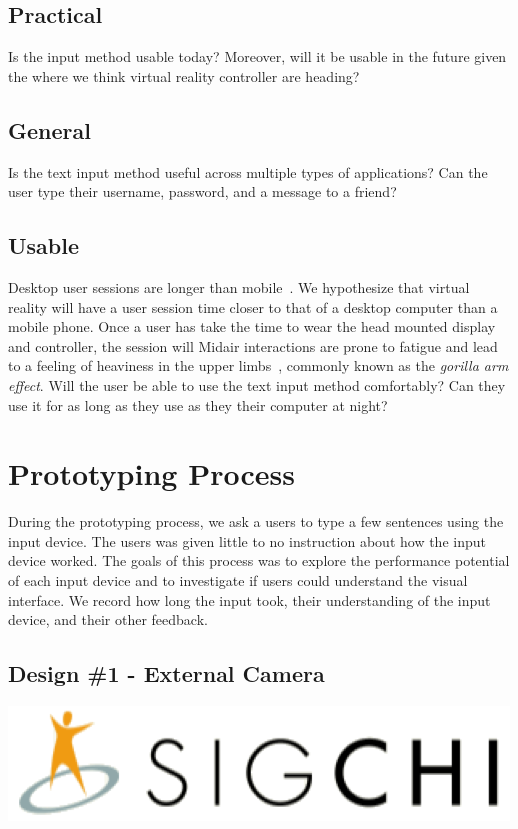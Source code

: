 \documentclass{sigchi}
\begin{document}
\subsection{Practical}
Is the input method usable today?
Moreover, will it be usable in the future given the where we think virtual reality controller are heading?

\subsection{General}
Is the text input method useful across multiple types of applications?
Can the user type their username, password, and a message to a friend?

\subsection{Usable}
Desktop user sessions are longer than mobile~\cite{Kamvar:2009:CIM:1526709.1526817}.
We hypothesize that virtual reality will have a user session time closer to that of a desktop computer than a mobile phone.
Once a user has take the time to wear the head mounted display and controller, the session will
Midair interactions are prone to fatigue and lead to a feeling
of heaviness in the upper limbs~\cite{Hincapie-Ramos:2014:CEM:2556288.2557130}, commonly known as the \textit{gorilla arm effect}.
Will the user be able to use the text input method comfortably?
Can they use it for as long as they use as they their computer at night?

\section{Prototyping Process}
During the prototyping process, we ask a users to type a few sentences using the input device. 
The users was given little to no instruction about how the input device worked.
The goals of this process was to explore the performance potential of each input device and to investigate if users could understand the visual interface.
We record how long the input took, their understanding of the input device, and their other feedback.

\subsection{Design \#1 - External Camera}
\vspace*{.1cm}
\includegraphics[width=.9\columnwidth]{figures/sigchi-logo}
\end{document}
